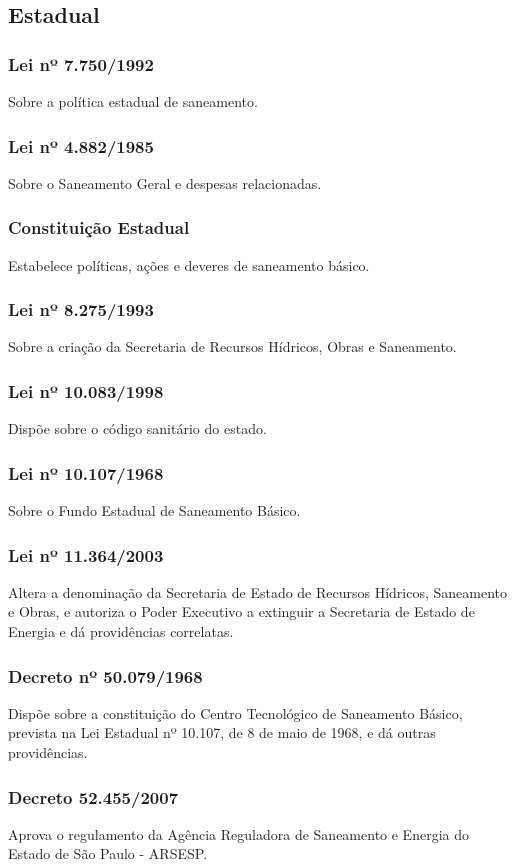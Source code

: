 \subsection{Estadual}
\begin{subapend}
	
	\begin{subsubapend}
		\subsubsection{Lei nº 7.750/1992}
		Sobre a política estadual de saneamento.
		\subsubsection{Lei nº 4.882/1985}
		Sobre o Saneamento Geral e despesas relacionadas.
		\subsubsection{Constituição Estadual}
		Estabelece políticas, ações e deveres de saneamento básico.
		\subsubsection{Lei nº 8.275/1993}
		Sobre a criação da Secretaria de Recursos Hídricos, Obras e Saneamento.
		\subsubsection{Lei nº 10.083/1998}
		Dispõe sobre o código sanitário do estado.
		\subsubsection{Lei nº 10.107/1968}
		Sobre o Fundo Estadual de Saneamento Básico.
		\subsubsection{Lei nº 11.364/2003}
		Altera a denominação da Secretaria de Estado de Recursos Hídricos, Saneamento e Obras, e autoriza o Poder Executivo a extinguir a Secretaria de Estado de Energia e dá providências correlatas.
		\subsubsection{Decreto nº 50.079/1968}
		Dispõe sobre a constituição do Centro Tecnológico de Saneamento Básico, prevista na Lei Estadual nº 10.107, de 8 de maio de 1968, e dá outras providências.
		\subsubsection{Decreto 52.455/2007}
		Aprova o regulamento da Agência Reguladora de Saneamento e Energia do Estado de São Paulo - ARSESP.

\end{subsubapend}
\end{subapend}
